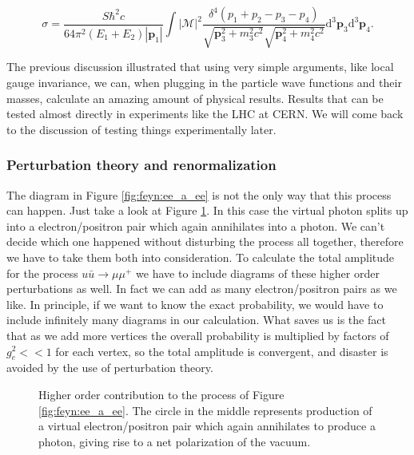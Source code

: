 \begin{equation}
	\sigma = \frac{S\hbar^2c}{64\pi^2(E_1+E_2)|\mathbf{p}_1|} \int | \mathcal{M} |^2
	\frac{\delta^4(p_1+p_2-p_3-p_4)}{\sqrt{\mathbf{p}_3^2+m_3^2c^2}\sqrt{\mathbf{p}_4^2+m_4^2c^2}} \textrm{d}^3\mathbf{p}_3\textrm{d}^3\mathbf{p}_4.
\end{equation}

The previous discussion illustrated that using very simple arguments, like local gauge invariance, we can, when plugging in the particle wave functions and their masses, calculate an amazing amount of physical results. Results that can be tested almost directly in experiments like the LHC at CERN. We will come back to the discussion of testing things experimentally later.

\subsubsection{Perturbation theory and renormalization}
The diagram in Figure \ref{fig:feyn:ee_a_ee} is not the only way that this process can happen. Just take a look at Figure \ref{fig:feyn:ee_a_ee_2}. In this case the virtual photon splits up into a electron/positron pair which again annihilates into a photon. We can't decide which one happened without disturbing the process all together, therefore we have to take them both into consideration. To calculate the total amplitude for the process $u \bar u \rightarrow \mu \mu^+$ we have to include diagrams of these higher order perturbations as well. In fact we can add as many electron/positron pairs as we like. In principle, if we want to know the exact probability, we would have to include infinitely many diagrams in our calculation. What saves us is the fact that as we add more vertices the overall probability is multiplied by factors of $g_e^2 << 1$ for each vertex, so the total amplitude is convergent, and disaster is avoided by the use of perturbation theory.

\begin{figure}[htp]
\centering
	
\caption{Higher order contribution to the process of Figure \ref{fig:feyn:ee_a_ee}. The circle in the middle represents production of a virtual electron/positron pair which again annihilates to produce a photon, giving rise to a net polarization of the vacuum.} \label{fig:feyn:ee_a_ee_2}
\end{figure}

